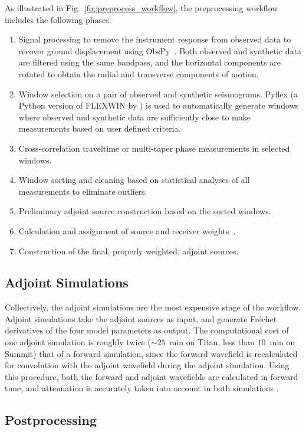 \documentclass[extra,mreferee]{gji}
\begin{document}
As illustrated in Fig.~\ref{fig:preprocess_workflow}, the preprocessing workflow
includes the following phases.
\begin{enumerate}
  \item Signal processing to remove the instrument response from observed data
    to recover ground displacement using ObsPy~\citep{obspy2010}. Both observed and synthetic data are filtered using the same bandpass, and the horizontal components are rotated to obtain the radial and transverse components of motion.
  \item Window selection on a pair of
    observed and synthetic seismograms. Pyflex (a Python version
    of FLEXWIN by \citet{krischer2015}) is
    used to automatically generate windows where observed and
    synthetic data are sufficiently close to make measurements based on user defined
    criteria.
  \item Cross-correlation traveltime or multi-taper phase measurements in selected windows.
  \item Window sorting and cleaning based on statistical analyses of all measurements to eliminate outliers.
  \item Preliminary adjoint source construction based on the sorted windows.
  \item Calculation and assignment of source and receiver weights~\citep{Ruanetal2018}.
  \item Construction of the final, properly weighted, adjoint sources.
\end{enumerate}

\subsection{Adjoint Simulations}

Collectively,
the adjoint simulations are the most expensive stage of the workflow. 
Adjoint simulations take the adjoint sources as input, and generate Fr\'echet
derivatives of the four model parameters as output.
The computational cost of one adjoint simulation is roughly twice ($\sim25$~min on Titan, less than $10$~min on Summit) that of
a forward simulation, since the forward wavefield is recalculated for convolution with
the adjoint wavefield during the adjoint simulation.
Using this procedure,
both the forward and adjoint wavefields are calculated in forward time,
and attenuation is accurately taken into account in both simulations \citep{KoXiBoPeSaLiTr16}.

\subsection{Postprocessing}
\end{document}
